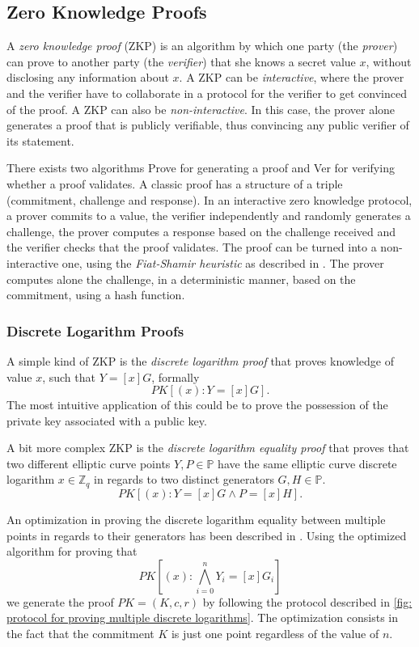 \clearpage
\subsection{Zero Knowledge Proofs}
A \textit{zero knowledge proof} (ZKP) is an algorithm by which one party (the \textit{prover}) can prove to another party (the \textit{verifier}) that she knows a secret value $x$, without disclosing any information about $x$. A ZKP can be \textit{interactive}, where the prover and the verifier have to collaborate in a protocol for the verifier to get convinced of the proof. A ZKP can also be \textit{non-interactive}. In this case, the prover alone generates a proof that is publicly verifiable, thus convincing any public verifier of its statement. 

There exists two algorithms \textsf{Prove} for generating a proof and \textsf{Ver} for verifying whether a proof validates. A classic proof has a structure of a triple (commitment, challenge and response). In an interactive zero knowledge protocol, a prover commits to a value, the verifier independently and randomly generates a challenge, the prover computes a response based on the challenge received and the verifier checks that the proof validates. The proof can be turned into a non-interactive one, using the \textit{Fiat-Shamir heuristic} as described in \cite{Fiat87}. The prover computes alone the challenge, in a deterministic manner, based on the commitment, using a hash function.


\subsubsection{Discrete Logarithm Proofs} \label{app: discrete logarithm proofs}
A simple kind of ZKP is the \textit{discrete logarithm proof} that proves knowledge of value $x$, such that $Y = [x]G$, formally 
\[ PK[(x) : Y = [x]G]. \]
The most intuitive application of this could be to prove the possession of the private key associated with a public key.

A bit more complex ZKP is the \textit{discrete logarithm equality proof} that proves that two different elliptic curve points $Y, P \in \mathbb{P}$ have the same elliptic curve discrete logarithm $x \in \mathbb{Z}_q$ in regards to two distinct generators $G, H \in \mathbb{P}$.
\[ PK[(x) : Y = [x]G \wedge P = [x]H]. \]

An optimization in proving the discrete logarithm equality between multiple points in regards to their generators has been described in \cite{Chow10}. Using the optimized algorithm for proving that
\[ PK[(x) : \bigwedge_{i=0}^{n} Y_i = [x]G_i] \]
we generate the proof $PK = (K, c, r)$ by following the protocol described in \cref{fig: protocol for proving multiple discrete logarithms}. The optimization consists in the fact that the commitment $K$ is just one point regardless of the value of $n$.


